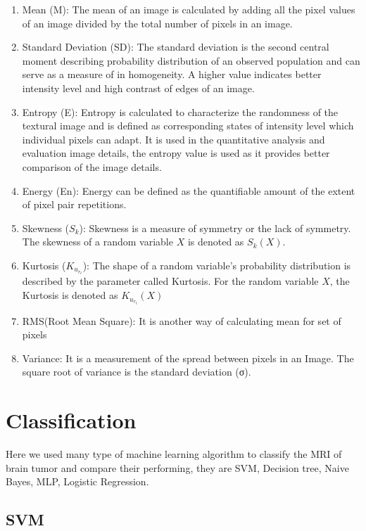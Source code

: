 \begin{enumerate}
    \item Mean (M): The mean of an image is calculated by adding all the pixel values of an image divided by the total number of pixels in an image.
    \item Standard Deviation (SD):  The standard deviation is the second central moment describing probability distribution of an observed population and can serve as a measure of in homogeneity. A higher value indicates better intensity level and high contrast of edges of an image.
    \item Entropy (E): Entropy is calculated to characterize the randomness of the textural image and is defined as corresponding states of intensity level which individual pixels can adapt. It is used in the quantitative analysis and evaluation image details, the entropy value is used as it provides better comparison of the image details.
    \item Energy (En): Energy can be defined as the quantifiable amount of the extent of pixel pair repetitions.
    \item Skewness ($S_k$): Skewness is a measure of symmetry or the lack of symmetry. The skewness of a random variable $X$ is denoted as $S_k(X)$.
    \item Kurtosis ($K_u_r_t$): The shape of a random variable’s probability distribution is described by the parameter called Kurtosis. For the random variable $X$, the Kurtosis is denoted as $K_u_r_t(X)$
    \item RMS(Root Mean Square): It is another way of calculating mean for set of pixels
    \item Variance: It is a measurement of the spread between pixels in an Image. The square root of variance is the standard deviation (σ).
\end{enumerate}

\section{Classification}
   
   Here we used many type of machine learning algorithm to
   classify the MRI of brain tumor and compare their performing, they are SVM, Decision tree, Naive Bayes, MLP, Logistic Regression.
  
\subsection{SVM}

